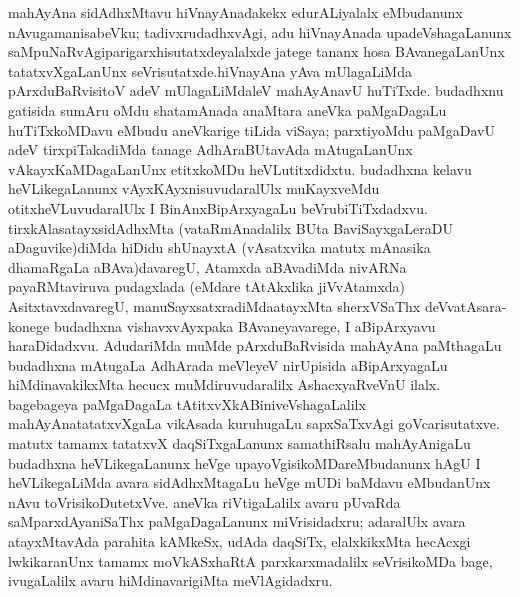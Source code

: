 mahAyAna sidAdhxMtavu hiVnayAnadakekx edurALiyalalx eMbudanunx nAvu\break gamanisabeVku; tadivxrudadhxvAgi, adu hiVnayAnada upadeVshagaLanunx saMpuNaRvAgi\break parigarxhisutatxdeyalalxde jatege tananx hosa BAvanegaLanUnx tatatxvXgaLanUnx seVrisutatxde.\break hiVnayAna yAva mUlagaLiMda pArxduBaRvisitoV adeV mUlagaLiMdaleV mahA\-yAnavU huTiTxde. budadhxnu gatisida sumAru oMdu shatamAnada anaMtara aneVka paMga\-DagaLu huTiTxkoMDavu eMbudu aneVkarige tiLida viSaya; parxtiyoMdu paMga\-DavU adeV tirxpiTakadiMda tanage AdhAraBUtavAda mAtugaLanUnx vAkayxKaMDa\-gaLanUnx  etitxkoMDu heVLutitxdidxtu. budadhxna kelavu heVLikegaLanunx vAyxKAyxnisuvudaralUlx muKayx\-veMdu otitxheVLuvudaralUlx I BinAnxBipArxyagaLu beVrubiTiTxdadxvu. tirxkAlasatayxsidAdhxMta (vataRmAnadalilx BUta BaviSayxgaLeraDU aDaguvike)diMda hiDidu shUnayxtA (vAsatxvika matutx mAnasika dhamaRgaLa aBAva)davaregU, Atamxda aBAvadiMda nivARNa payaRMta\-viruva pudagxlada (eMdare tAtAkxlika jiVvAtamxda) AsitxtavxdavaregU, manuSayxsatxradiMda\break atayxMta sherxVSaThx deVvatAsara-konege budadhxna vishavxvAyxpaka BAvaneyavarege, I aBipArxyavu haraDidadxvu. AdudariMda muMde pArxduBaRvisida mahAyAna paMthagaLu budadhxna mAtugaLa AdhArada meVleyeV nirUpisida aBipArxyagaLu hiMdinavakikxMta hecucx muMdiruvudaralilx AshacxyaR\-veVnU ilalx. bagebageya paMgaDagaLa tAtitxvXkABiniveVshagaLalilx mahAyAnatatatxvXgaLa vikAsada kuruhugaLu sapxSaTxvAgi goVcarisutatxve. matutx tamamx tatatxvX daqSiTx\-gaLanunx samathiRsalu mahAyAnigaLu budadhxna heVLikegaLanunx heVge upayoVgisikoMDareMbudanunx hAgU I heVLikegaLiMda avara sidAdhxMtagaLu heVge mUDi baMdavu eMbudanUnx nAvu toVrisi\-koDu\-tetxVve. aneVka riVtigaLalilx avaru pUvaRda saMparxdAyaniSaThx paMgaDagaLanunx miVrisidadxru; adaralUlx avara atayxMtavAda parahita kAMkeSx, udAda daqSiTx, elalxkikxMta hecAcxgi lwkikaranUnx tamamx moVkASxhaRtA parxkarxmadalilx seVrisikoMDa bage, ivugaLalilx avaru hiMdinava\-rigiMta meVlAgidadxru.

